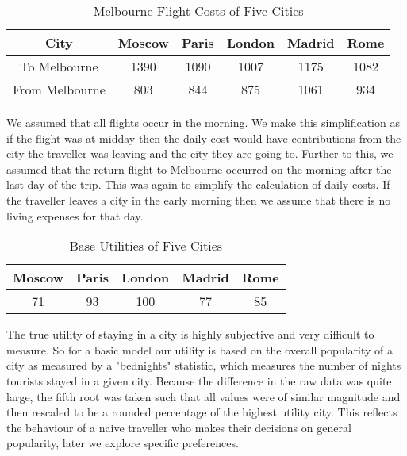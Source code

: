 \documentclass[12pt]{article}
\begin{document}
\begin{table}[h]
\caption{Melbourne Flight Costs of Five Cities}
\centering
\vspace{1mm}
\begin{tabular}{c|c|c|c|c|c}
\hline
\rule{0pt}{2ex} City & Moscow & Paris & London & Madrid & Rome \\
\hline
\rule{0pt}{2ex} To Melbourne & 1390 & 1090 & 1007 & 1175 & 1082 \\
\rule{0pt}{2ex} From Melbourne & 803 & 844 & 875 & 1061 & 934 \\
\end{tabular}
\end{table}

We assumed that all flights occur in the morning. We make this simplification as if the flight was at midday then the daily cost would have contributions from the city the traveller was leaving and the city they are going to. Further to this, we assumed that the return flight to Melbourne occurred on the morning after the last day of the trip. This was again to simplify the calculation of daily costs. If the traveller leaves a city in the early morning then we assume that there is no living expenses for that day.

\begin{table}[h]
\caption{Base Utilities of Five Cities}
\centering
\vspace{1mm}
\begin{tabular}{c|c|c|c|c}
\hline
\rule{0pt}{2ex} Moscow & Paris & London & Madrid & Rome \\
\hline
\rule{0pt}{2ex} 71 & 93 & 100 & 77 & 85 \\
\end{tabular}
\end{table}
The true utility of staying in a city is highly subjective and very difficult to measure. So for a basic model our utility is based on the overall popularity of a city as measured by a "bednights" statistic, which measures the number of nights tourists stayed in a given city. Because the difference in the raw data was quite large, the fifth root was taken such that all values were of similar magnitude and then rescaled to be a rounded percentage of the highest utility city. This reflects the behaviour of a naive traveller who makes their decisions on general popularity, later we explore specific preferences.

\pagebreak
\end{document}
